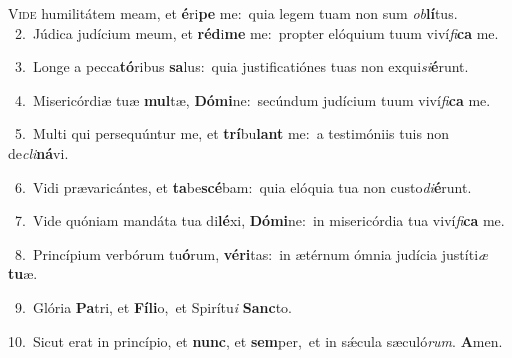 \lettrine{\initial\textcolor{\initialcolor}{V}}{ide} humilitátem meam, et \textbf{é}\-ri\textbf{pe} me:~\star quia legem tuam non sum \textit{ob}\-\textbf{lí}tus.\\
{\numbfont\textcolor{\numbcolor}{~2.}}~Júdica judícium meum, et \textbf{réd}\-i\textbf{me} me:~\star propter elóquium tuum viví\-\textit{fi}\-\textbf{ca} me.\par
{\numbfont\textcolor{\numbcolor}{~3.}}~Longe a pecca\-\textbf{tó}\-ribus \textbf{sa}\-lus:~\star quia justificatiónes tuas non exqui\-\textit{si}\-\textbf{é}runt.\par
{\numbfont\textcolor{\numbcolor}{~4.}}~Misericórdiæ tuæ \textbf{mul}\-tæ, \textbf{Dó}\-\textbf{mi}ne:~\star secúndum judícium tuum viví\-\textit{fi}\-\textbf{ca} me.\par
{\numbfont\textcolor{\numbcolor}{~5.}}~Multi qui persequúntur me, et \textbf{trí}\-bu\textbf{lant} me:~\star a testimóniis tuis non de\-\textit{cli}\-\textbf{ná}vi.\par
{\numbfont\textcolor{\numbcolor}{~6.}}~Vidi prævaricántes, et \textbf{ta}\-be\-\textbf{scé}\-bam:~\star quia elóquia tua non custo\-\textit{di}\-\textbf{é}runt.\par
{\numbfont\textcolor{\numbcolor}{~7.}}~Vide quóniam mandáta tua di\-\textbf{lé}\-xi, \textbf{Dó}\-\textbf{mi}ne:~\star in misericórdia tua viví\-\textit{fi}\-\textbf{ca} me.\par
{\numbfont\textcolor{\numbcolor}{~8.}}~Princípium verbórum tu\-\textbf{ó}\-rum, \textbf{vé}\-\textbf{ri}tas:~\star in ætérnum ómnia judícia justíti\textit{æ} \textbf{tu}\-æ.\par
{\numbfont\textcolor{\numbcolor}{~9.}}~Glória \textbf{Pa}\-tri, et \textbf{Fí}\-\textbf{li}o,~\star et Spirítu\textit{i} \textbf{Sanc}\-to.\par
{\numbfont\textcolor{\numbcolor}{10.}}~Sicut erat in princípio, et \textbf{nunc}\-, et \textbf{sem}\-per,~\star et in sǽcula sæculó\-\textit{rum}\-. \textbf{A}\-men.\par
